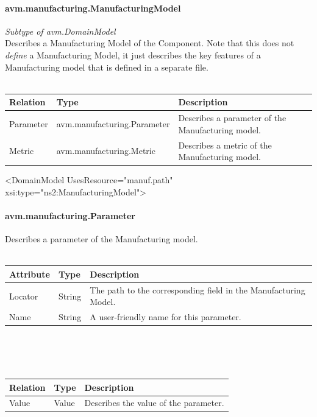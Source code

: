 \paragraph{avm.manufacturing.ManufacturingModel}
\textit{Subtype of avm.DomainModel}\\
Describes a Manufacturing Model of the Component.
Note that this does not \textit{define} a Manufacturing Model, it just describes the key features of a Manufacturing model that is defined in a separate file.
\\ \\
\begin{tabular}{ l l p{9cm} }
\textbf{Relation} & \textbf{Type} & \textbf{Description} \\ \hline
Parameter & avm.manufacturing.Parameter & Describes a parameter of the Manufacturing model. \\ \hline
Metric & avm.manufacturing.Metric & Describes a metric of the Manufacturing model. \\ \hline
\end{tabular}

\begin{MyVerbatim}
  <DomainModel UsesResource="manuf.path" 
    xsi:type="ns2:ManufacturingModel">
\end{MyVerbatim}

\paragraph{avm.manufacturing.Parameter}
Describes a parameter of the Manufacturing model.
\\ \\
\begin{tabular}{ l l p{11cm} }
\textbf{Attribute} & \textbf{Type} & \textbf{Description} \\ \hline
Locator & String & The path to the corresponding field in the Manufacturing Model. \\ \hline
Name & String & A user-friendly name for this parameter. \\ \hline
\end{tabular}
\\ \\ \\
\begin{tabular}{ l l p{11cm} }
\textbf{Relation} & \textbf{Type} & \textbf{Description} \\ \hline
Value & Value & Describes the value of the parameter. \\ \hline
\end{tabular}

